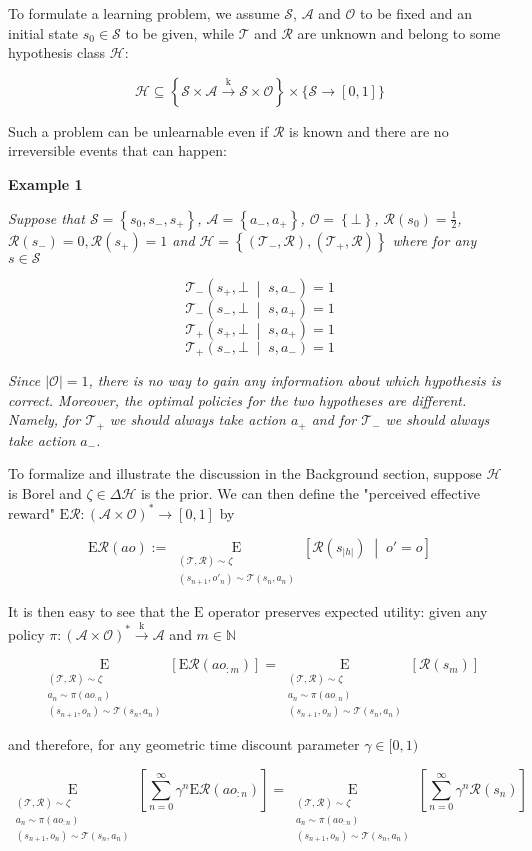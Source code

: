 \documentclass[a4paper]{article}
\newcommand{\Co}[1]{}
\newcommand{\AP}[1]{\left(#1\right)}
\newcommand{\AB}[1]{\left[#1\right]}
\newcommand{\AC}[1]{\left\{#1\right\}}
\newcommand{\APM}[2]{\left(#1\;\middle\vert\;#2\right)}
\newcommand{\ABM}[2]{\left[#1\;\middle\vert\;#2\right]}
\newcommand{\Ea}[2]{\underset{#1}{\operatorname{E}}\AB{#2}}
\newcommand{\CE}[3]{\underset{#1}{\operatorname{E}}\ABM{#2}{#3}}
\newcommand{\Nats}{\mathbb{N}}
\newcommand{\Abs}[1]{\left\vert #1 \right\vert}
\newcommand{\K}{\xrightarrow{\mathrm{k}}}
\newcommand{\St}{\mathcal{S}}
\newcommand{\A}{\mathcal{A}}
\newcommand{\Ob}{\mathcal{O}}
\newcommand{\AO}{\AP{\A\times\Ob}}
\newcommand{\FH}{\AO^*}
\newcommand{\R}{\mathcal{R}}
\newcommand{\T}{\mathcal{T}}
\newcommand{\Hy}{\mathcal{H}}
\newcommand{\ER}{\mathrm{E}}
\begin{document}
To formulate a learning problem, we assume $\St$, $\A$ and $\Ob$ to be fixed and an initial state $s_0\in\St$ to be given, while $\T$ and $\R$ are unknown and belong to some hypothesis class $\Hy$:

$$\Hy\subseteq\AC{\St\times\A\K\St\times\Ob}\times\bigg\{\St\rightarrow[0,1]\bigg\}$$

Such a problem can be unlearnable even if $\R$ is known and there are no irreversible events that can happen:

\textbf{Example 1}\Co{b}

\textit{Suppose that $\St=\AC{s_0,s_-,s_+}$, $\A=\AC{a_-,a_+}$, $\Ob=\AC{\bot}$, $\R\AP{s_0}=\frac{1}{2}$, $\R\AP{s_-}=0, \R\AP{s_+}=1$ and $\Hy=\AC{\AP{\T_-,\R},\AP{\T_+,\R}}$ where for any $s\in\St$}\Co{i}

$$\T_-\APM{s_+,\bot}{s,a_-}=1$$
$$\T_-\APM{s_-,\bot}{s,a_+}=1$$ 
$$\T_+\APM{s_+,\bot}{s,a_+}=1$$
$$\T_+\APM{s_-,\bot}{s,a_-}=1$$ 

\textit{Since $\Abs{\Ob}=1$, there is no way to gain any information about which hypothesis is correct. Moreover, the optimal policies for the two hypotheses are different. Namely, for $\T_+$ we should always take action $a_+$ and for $\T_-$ we should always take action $a_-$.}\Co{i}

To formalize and illustrate the discussion in the Background section, suppose $\Hy$ is Borel and $\zeta\in\Delta\Hy$ is the prior. We can then define the "perceived effective reward" $\ER\R:\FH\rightarrow[0,1]$ by

$$\ER\R(ao):=\CE{\substack{(\T,\R)\sim\zeta\\\AP{s_{n+1},o'_n}\sim\T\AP{s_n,a_n}}}{\R\AP{s_{\Abs{h}}}}{o'=o}$$

It is then easy to see that the $\ER$ operator preserves expected utility: given any policy $\pi:\FH\K \A$ and $m\in\Nats$

$$\Ea{\substack{(\T,\R)\sim\zeta\\a_n\sim\pi\AP{ao_{:n}}\\\AP{s_{n+1},o_n}\sim\T\AP{s_n,a_n}}}{\ER\R\AP{ao_{:m}}}=\Ea{\substack{(\T,\R)\sim\zeta\\a_n\sim\pi\AP{ao_{:n}}\\\AP{s_{n+1},o_n}\sim\T\AP{s_n,a_n}}}{\R\AP{s_m}}$$

and therefore, for any geometric time discount parameter $\gamma\in[0,1)$

$$\Ea{\substack{(\T,\R)\sim\zeta\\a_n\sim\pi\AP{ao_{:n}}\\\AP{s_{n+1},o_n}\sim\T\AP{s_n,a_n}}}{\sum_{n=0}^\infty\gamma^n\ER\R\AP{ao_{:n}}}=\Ea{\substack{(\T,\R)\sim\zeta\\a_n\sim\pi\AP{ao_{:n}}\\\AP{s_{n+1},o_n}\sim\T\AP{s_n,a_n}}}{\sum_{n=0}^\infty\gamma^n\R\AP{s_n}}$$
\end{document}
